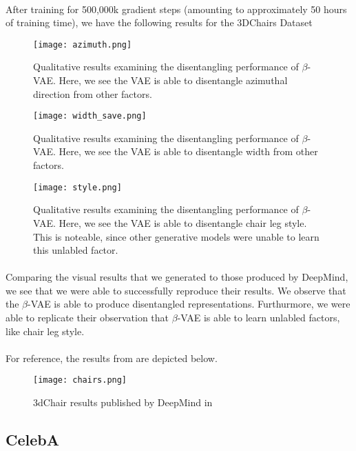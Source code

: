 \documentclass[justified,nobib]{tufte-handout}
\begin{document}
\begin{fullwidth}
\paragraph{} After training for 500,000k gradient steps (amounting to approximately 50 hours of training time), we have the following results for the 3DChairs Dataset
\begin{figure}
\centering
\label{azi}
\texttt{[image: azimuth.png]}
\caption{Qualitative results examining the disentangling performance of $\beta$-VAE. Here, we see the VAE is able to disentangle azimuthal direction from other factors.} 
\end{figure}
\begin{figure}
\centering
\label{width}
\texttt{[image: width\_save.png]}
\caption{Qualitative results examining the disentangling performance of $\beta$-VAE. Here, we see the VAE is able to disentangle width from other factors.} 
\end{figure}
\begin{figure}
\centering
\label{style}
\texttt{[image: style.png]}
\caption{Qualitative results examining the disentangling performance of $\beta$-VAE. Here, we see the VAE is able to disentangle chair leg style. This is noteable, since other generative models were unable to learn this unlabled factor.} 
\end{figure}
\paragraph{} Comparing the visual results that we generated to those produced by DeepMind, we see that we were able to successfully reproduce their results. We observe that the $\beta$-VAE is able to produce disentangled representations. Furthurmore, we were able to replicate their observation that $\beta$-VAE is able to learn unlabled factors, like chair leg style. 
\clearpage
\paragraph{} For reference, the results from \cite{bvae} are depicted below.
\begin{figure}
\centering
\label{bvae}
\texttt{[image: chairs.png]}
\caption{3dChair results published by DeepMind in \cite{bvae}} 
\end{figure}
\clearpage
\subsection{CelebA}

\end{fullwidth}
\end{document}
